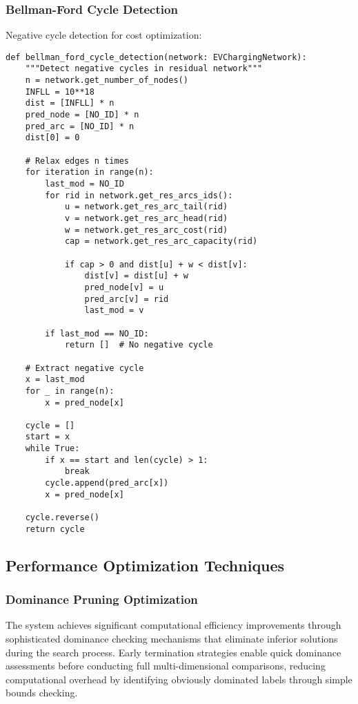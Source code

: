 \documentclass[12pt,a4paper]{article}
\begin{document}
\subsubsection{Bellman-Ford Cycle Detection}
Negative cycle detection for cost optimization:

\begin{lstlisting}[caption=Bellman-Ford for Cycle Detection]
def bellman_ford_cycle_detection(network: EVChargingNetwork):
    """Detect negative cycles in residual network"""
    n = network.get_number_of_nodes()
    INFLL = 10**18
    dist = [INFLL] * n
    pred_node = [NO_ID] * n
    pred_arc = [NO_ID] * n
    dist[0] = 0
    
    # Relax edges n times
    for iteration in range(n):
        last_mod = NO_ID
        for rid in network.get_res_arcs_ids():
            u = network.get_res_arc_tail(rid)
            v = network.get_res_arc_head(rid)
            w = network.get_res_arc_cost(rid)
            cap = network.get_res_arc_capacity(rid)
            
            if cap > 0 and dist[u] + w < dist[v]:
                dist[v] = dist[u] + w
                pred_node[v] = u
                pred_arc[v] = rid
                last_mod = v
        
        if last_mod == NO_ID:
            return []  # No negative cycle
    
    # Extract negative cycle
    x = last_mod
    for _ in range(n):
        x = pred_node[x]
    
    cycle = []
    start = x
    while True:
        if x == start and len(cycle) > 1:
            break
        cycle.append(pred_arc[x])
        x = pred_node[x]
    
    cycle.reverse()
    return cycle
\end{lstlisting}

\subsection{Performance Optimization Techniques}

\subsubsection{Dominance Pruning Optimization}
The system achieves significant computational efficiency improvements through sophisticated dominance checking mechanisms that eliminate inferior solutions during the search process. Early termination strategies enable quick dominance assessments before conducting full multi-dimensional comparisons, reducing computational overhead by identifying obviously dominated labels through simple bounds checking.
\end{document}
